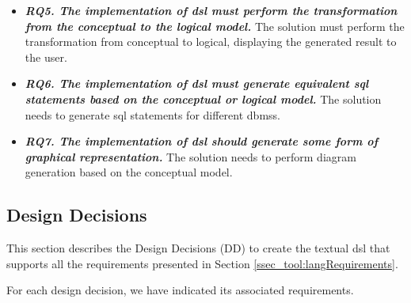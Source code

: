 \begin{itemize}
\item\textit{\textbf{RQ5. The implementation of \ac{dsl} must perform the transformation from the conceptual to the logical model.}}
The solution must perform the transformation from conceptual to logical, displaying the generated result to the user.

\item\textit{\textbf{RQ6. The implementation of \ac{dsl} must generate equivalent \ac{sql} statements based on the conceptual or logical model.}}
The solution needs to generate \ac{sql} statements for different \acp{dbms}.

\item\textit{\textbf{RQ7. The implementation of \ac{dsl} should generate some form of graphical representation.}}
The solution needs to perform diagram generation based on the conceptual model.

\end{itemize}

\subsection{Design Decisions} \label{ssec_tool:designDecisions}

This section describes the Design Decisions (DD) to create the textual \ac{dsl} that supports all the requirements presented in Section \ref{ssec_tool:langRequirements}.

For each design decision, we have indicated its associated requirements.

